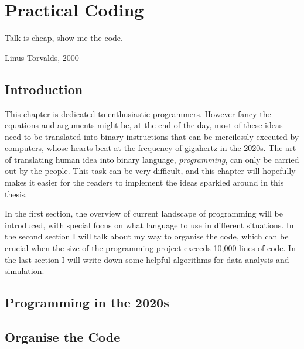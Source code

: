 \documentclass[11pt,twoside]{report}
\begin{document}
\chapter{Practical Coding}
\label{chapter:algorithms}

\epigraph{Talk is cheap, show me the code.}{Linus Torvalds, 2000}

\section{Introduction}

This chapter is dedicated to enthusiastic programmers. However fancy the equations and arguments might be, at the end of the day, most of these ideas need to be translated into binary instructions that can be mercilessly executed by computers, whose hearts beat at the frequency of gigahertz in the 2020s. The art of translating human idea into binary language, \emph{programming}, can only be carried out by the people. This task can be very difficult, and this chapter will hopefully makes it easier for the readers to implement the ideas sparkled around in this thesis.

In the first section, the overview of current landscape of programming will be introduced, with special focus on what language to use in different situations. In the second section I will talk about my way to organise the code, which can be crucial when the size of the programming project exceeds 10,000 lines of code. In the last section I will write down some helpful algorithms for data analysis and simulation.

\section{Programming in the 2020s}

\section{Organise the Code}
\end{document}
